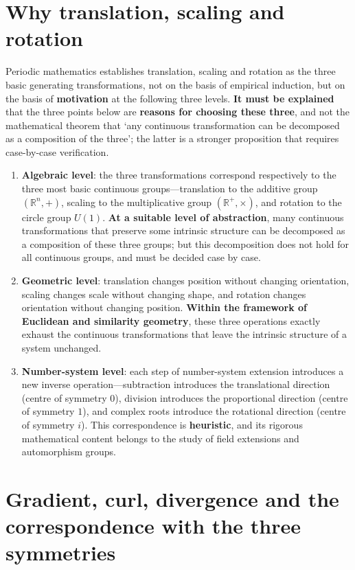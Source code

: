 \section*{Why translation, scaling and rotation}

Periodic mathematics establishes translation, scaling and rotation as the three basic generating transformations, not on the basis of empirical induction, but on the basis of \textbf{motivation} at the following three levels. \textbf{It must be explained} that the three points below are \textbf{reasons for choosing these three}, and not the mathematical theorem that `any continuous transformation can be decomposed as a composition of the three'; the latter is a stronger proposition that requires case-by-case verification.

\begin{enumerate}[label=(\roman*)]
    \item \textbf{Algebraic level}: the three transformations correspond respectively to the three most basic continuous groups---translation to the additive group $(\mathbb{R}^n,+)$, scaling to the multiplicative group $(\mathbb{R}^+,\times)$, and rotation to the circle group $U(1)$. \textbf{At a suitable level of abstraction}, many continuous transformations that preserve some intrinsic structure can be decomposed as a composition of these three groups; but this decomposition does not hold for all continuous groups, and must be decided case by case.
    \item \textbf{Geometric level}: translation changes position without changing orientation, scaling changes scale without changing shape, and rotation changes orientation without changing position. \textbf{Within the framework of Euclidean and similarity geometry}, these three operations exactly exhaust the continuous transformations that leave the intrinsic structure of a system unchanged.
    \item \textbf{Number-system level}: each step of number-system extension introduces a new inverse operation---subtraction introduces the translational direction (centre of symmetry $0$), division introduces the proportional direction (centre of symmetry $1$), and complex roots introduce the rotational direction (centre of symmetry $i$). This correspondence is \textbf{heuristic}, and its rigorous mathematical content belongs to the study of field extensions and automorphism groups.
\end{enumerate}

\section*{Gradient, curl, divergence and the correspondence with the three symmetries}


